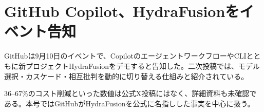 \section{GitHub Copilot、HydraFusionをイベント告知}
GitHubは9月10日のイベントで、CopilotのエージェントワークフローやCLIとともに新プロジェクトHydraFusionをデモすると告知した。二次投稿では、モデル選択・カスケード・相互批判を動的に切り替える仕組みと紹介されている。

36--67\%のコスト削減といった数値は公式X投稿にはなく、詳細資料も未確認である。本号ではGitHubがHydraFusionを公式に名指しした事実を中心に扱う。
